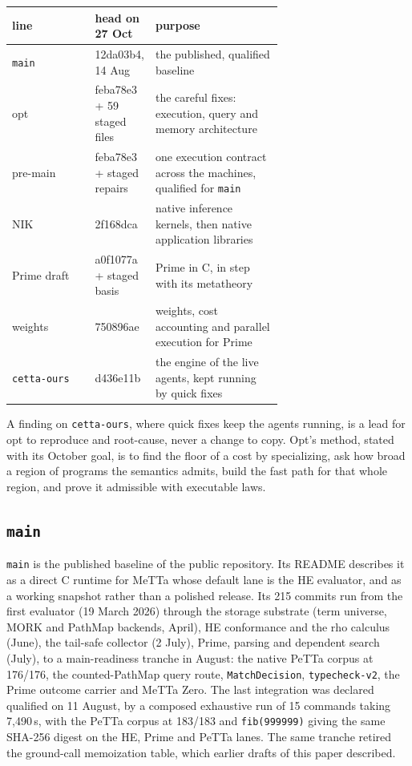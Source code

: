 \documentclass[11pt]{article}
\newcommand{\code}[1]{\texttt{#1}}
\newcommand{\PeTTa}{\textup{PeTTa}}
\newcommand{\HE}{\textup{HE}}
\newcommand{\PathMap}{\textup{PathMap}}
\begin{document}
\begin{center}
\small
\begin{tabular}{@{}lp{0.20\linewidth}p{0.47\linewidth}@{}}
\toprule
line & head on 27 Oct & purpose \\
\midrule
\code{main} & 12da03b4, 14 Aug & the published, qualified baseline \\
opt & feba78e3 + 59 staged files & the careful fixes: execution, query and memory architecture \\
pre-main & feba78e3 + staged repairs & one execution contract across the machines, qualified for \code{main} \\
NIK & 2f168dca & native inference kernels, then native application libraries \\
Prime draft & a0f1077a + staged basis & Prime in C, in step with its metatheory \\
weights & 750896ae & weights, cost accounting and parallel execution for Prime \\
\code{cetta-ours} & d436e11b & the engine of the live agents, kept running by quick fixes \\
\bottomrule
\end{tabular}
\end{center}

\noindent
A finding on \code{cetta-ours}, where quick fixes keep the agents running, is
a lead for opt to reproduce and root-cause, never a change to copy.  Opt's
method, stated with its October goal, is to find the floor of a cost by
specializing, ask how broad a region of programs the semantics admits, build
the fast path for that whole region, and prove it admissible with executable
laws.

\subsection{\code{main}}
\label{sec:line-main}

\code{main} is the published baseline of the public repository.  Its README
describes it as a direct C runtime for MeTTa whose default lane is the \HE{}
evaluator, and as a working snapshot rather than a polished release.  Its 215
commits run from the first evaluator (19 March 2026) through the
storage substrate (term universe, MORK and \PathMap{} backends, April), \HE{}
conformance and the rho calculus (June), the tail-safe collector (2 July),
Prime, parsing and dependent search (July), to a main-readiness tranche in
August: the native \PeTTa{} corpus at 176/176, the counted-\PathMap{} query
route, \code{MatchDecision}, \code{typecheck-v2}, the Prime outcome carrier
and MeTTa Zero.  The last integration was declared qualified on 11 August, by
a composed exhaustive run of 15 commands taking 7{,}490\,s, with the \PeTTa{}
corpus at 183/183 and \code{fib(999999)} giving the same SHA-256 digest on
the \HE{}, Prime and \PeTTa{} lanes.  The same tranche retired the ground-call
memoization table, which earlier drafts of this paper described.
\end{document}
